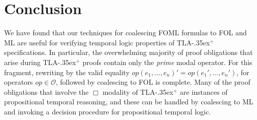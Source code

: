 \documentclass{easychair}
\newcommand{\tlaplus}{\mbox{TLA\kern -.35ex$^+$}\xspace}
\newcommand{\init}{\texttt{INIT}}
\newcommand{\next}{\texttt{NEXT}}
\newcommand{\OO}{\mathcal{O}}
\newcommand{\edmargin}[2]{\marginpar{\raggedright\footnotesize\color{red}#1: #2}}
\newcommand{\edmargin}[2]{}
\def\smmargin{\edmargin{SM}}
\begin{document}
%
%
%
%

\section{Conclusion}
\label{sec:conclusion}


We have found that our techniques for coalescing FOML formulas to
FOL and ML are useful for verifying temporal logic properties of
\tlaplus specifications. In particular, the overwhelming majority of proof
obligations that arise during \tlaplus proofs
contain only the \emph{prime} modal operator. For this fragment,
rewriting by the valid equality $op(e_1,\ldots,e_n)' = op(e_1',\ldots,e_n')$, for
operators $op \in \OO$, followed by coalescing to FOL is complete. Many of the
proof obligations that involve the $\Box$ modality of \tlaplus are instances of
propositional temporal reasoning, and these can be handled by coalescing to
ML and invoking a decision procedure for propositional temporal logic.
\end{document}
